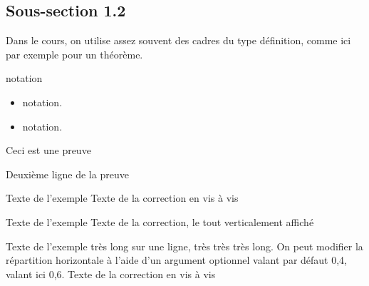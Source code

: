 \subsection{Sous-section 1.2}
\begin{theoreme}
  Dans le cours, on utilise assez souvent des cadres du type
  définition, comme ici par exemple pour un théorème.
\end{theoreme}
\begin{notation}
  notation
\end{notation}
\begin{notations}
  \begin{itemize}
    \item notation.
    \item notation.
  \end{itemize}
\end{notations}
\begin{preuve}
  Ceci est une preuve\par Deuxième ligne de la preuve
\end{preuve}
\begin{exemple}
  Texte de l’exemple
  \correction
  Texte de la correction en vis à vis
\end{exemple}

\begin{exemple*1}
  Texte de l’exemple
  \correction
  Texte de la correction, le tout verticalement affiché
\end{exemple*1}

\begin{exemple}[0.6]
  Texte de l’exemple très long sur une ligne, très très très long.
  On peut modifier la répartition horizontale  à l'aide d'un argument optionnel valant par défaut 0,4, valant ici 0,6.
  \correction
  Texte de la correction en vis à vis
\end{exemple}